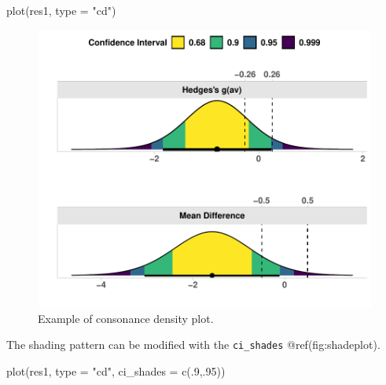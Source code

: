 \documentclass[]{interact}
\theoremstyle{plain}%
\theoremstyle{definition}
\theoremstyle{remark}
\newenvironment{Shaded}{\begin{snugshade}}{\end{snugshade}}
\newcommand{\AttributeTok}[1]{\textcolor[rgb]{0.77,0.63,0.00}{#1}}
\newcommand{\DecValTok}[1]{\textcolor[rgb]{0.00,0.00,0.81}{#1}}
\newcommand{\FunctionTok}[1]{\textcolor[rgb]{0.00,0.00,0.00}{#1}}
\newcommand{\NormalTok}[1]{#1}
\newcommand{\StringTok}[1]{\textcolor[rgb]{0.31,0.60,0.02}{#1}}
\begin{document}
\begin{Shaded}
\begin{Highlighting}[]
\FunctionTok{plot}\NormalTok{(res1, }\AttributeTok{type =} \StringTok{"cd"}\NormalTok{)}
\end{Highlighting}
\end{Shaded}

\begin{figure}
\centering
\includegraphics{Avocado_Update_files/figure-latex/cdplot-1.pdf}
\caption{Example of consonance density plot.}
\end{figure}

\newpage

The shading pattern can be modified with the \texttt{ci\_shades}
@ref(fig:shadeplot).

\begin{Shaded}
\begin{Highlighting}[]
\FunctionTok{plot}\NormalTok{(res1, }\AttributeTok{type =} \StringTok{"cd"}\NormalTok{,}
     \AttributeTok{ci\_shades =} \FunctionTok{c}\NormalTok{(.}\DecValTok{9}\NormalTok{,.}\DecValTok{95}\NormalTok{))}
\end{Highlighting}
\end{Shaded}
\end{document}
